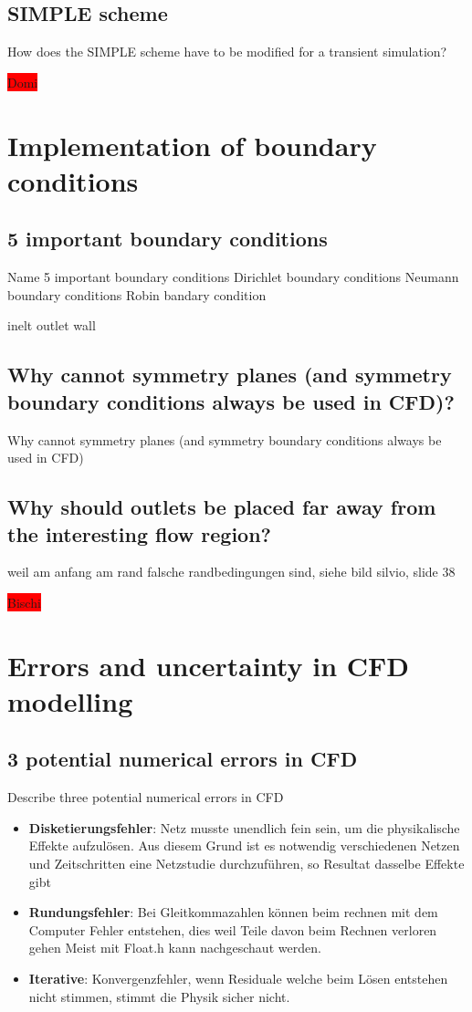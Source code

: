 \documentclass[a4paper]{scrartcl}
\begin{document}
\subsection{SIMPLE scheme}
How does the SIMPLE scheme have to be modified for a transient
simulation?

\colorbox{red}{Domi}


\section{Implementation of boundary conditions}


\subsection{5 important boundary conditions}

 Name 5 important boundary
conditions Dirichlet boundary conditions
Neumann boundary conditions
Robin bandary  condition


inelt
outlet
wall



\subsection{Why cannot symmetry planes (and symmetry boundary conditions always
be used in CFD)?}
Why cannot symmetry planes (and symmetry boundary conditions always
be used in CFD)
\subsection{Why should outlets be placed far away from the interesting flow
region?}
 weil am anfang am rand falsche randbedingungen sind, siehe bild silvio,
slide 38

\colorbox{red}{Bischi}

\section{Errors and uncertainty in CFD modelling}

\subsection{3 potential numerical errors in CFD}

Describe three potential numerical errors in CFD
\begin{itemize}
\item \textbf{Disketierungsfehler}: Netz musste unendlich fein sein, um die physikalische Effekte aufzulösen. Aus diesem Grund ist es notwendig verschiedenen Netzen und Zeitschritten eine Netzstudie durchzuführen, so Resultat dasselbe Effekte gibt
\item \textbf{Rundungsfehler}: Bei Gleitkommazahlen können beim rechnen mit dem Computer Fehler entstehen, dies weil Teile davon beim Rechnen verloren  gehen Meist mit Float.h kann nachgeschaut werden.
\item \textbf{Iterative}: Konvergenzfehler, wenn Residuale welche beim Lösen entstehen nicht stimmen, stimmt die Physik sicher nicht.  
\end{itemize}
\end{document}
